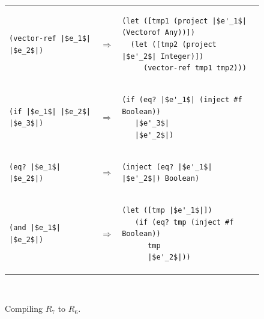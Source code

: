 \documentclass[11pt]{book}
\begin{document}
\begin{figure}[tbp]
\begin{tabular}{|lll|}
\begin{minipage}{0.6\textwidth}
\end{minipage}
\\[2ex]\hline
\begin{minipage}{0.25\textwidth}
\begin{lstlisting}
(vector-ref |$e_1$| |$e_2$|)
\end{lstlisting}
\end{minipage}
&
$\Rightarrow$
&
\begin{minipage}{0.6\textwidth}
\begin{lstlisting}
(let ([tmp1 (project |$e'_1$| (Vectorof Any))])
  (let ([tmp2 (project |$e'_2$| Integer)])
     (vector-ref tmp1 tmp2)))
\end{lstlisting}
\end{minipage}
\\[2ex]\hline
\begin{minipage}{0.25\textwidth}
\begin{lstlisting}
(if |$e_1$| |$e_2$| |$e_3$|)
\end{lstlisting}
\end{minipage}
&
$\Rightarrow$
&
\begin{minipage}{0.6\textwidth}
\begin{lstlisting}
(if (eq? |$e'_1$| (inject #f Boolean))
   |$e'_3$|
   |$e'_2$|)
\end{lstlisting}
\end{minipage}
\\[2ex]\hline
\begin{minipage}{0.25\textwidth}
\begin{lstlisting}
(eq? |$e_1$| |$e_2$|)
\end{lstlisting}
\end{minipage}
&
$\Rightarrow$
&
\begin{minipage}{0.6\textwidth}
\begin{lstlisting}
(inject (eq? |$e'_1$| |$e'_2$|) Boolean)
\end{lstlisting}
\end{minipage}
\\[2ex]\hline
\begin{minipage}{0.25\textwidth}
\begin{lstlisting}
(and |$e_1$| |$e_2$|)
\end{lstlisting}
\end{minipage}
&
$\Rightarrow$
&
\begin{minipage}{0.6\textwidth}
\begin{lstlisting}
(let ([tmp |$e'_1$|])
   (if (eq? tmp (inject #f Boolean))
      tmp
      |$e'_2$|))
\end{lstlisting}
\end{minipage} \\\hline
\end{tabular}  \\

\caption{Compiling $R_7$ to $R_6$.}
\label{fig:compile-r7-r6}
\end{figure}
\end{document}
